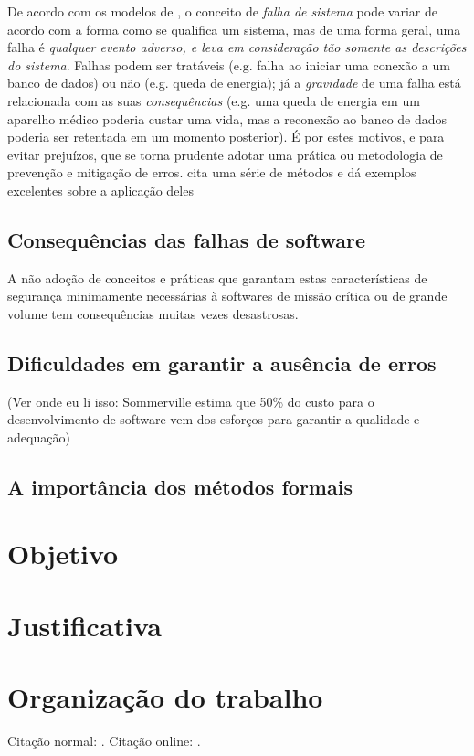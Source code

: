     De acordo com os modelos de \citeauthor{rushby_critical_1994}, o conceito 
    de \emph{falha de sistema} pode variar de acordo com a forma como se 
    qualifica um sistema, mas de uma forma geral, uma falha é \emph{qualquer 
    evento adverso, e leva em consideração tão somente as descrições do 
    sistema}. Falhas podem ser tratáveis (e.g. falha ao iniciar uma conexão a 
    um banco de dados) ou não (e.g. queda de energia); já a \emph{gravidade} de 
    uma falha está relacionada com as suas \emph{consequências} (e.g. uma queda 
    de energia em um aparelho médico poderia custar uma vida, mas a reconexão 
    ao banco de dados poderia ser retentada em um momento posterior). É por 
    estes motivos, e para evitar prejuízos, que se torna prudente adotar uma 
    prática ou metodologia de prevenção e mitigação de erros.    
    \cite{sommerville_critical_2008} cita uma série de métodos e dá exemplos 
    excelentes sobre a aplicação deles

    
    \subsection{Consequências das falhas de software}
    
    A não adoção de conceitos e práticas que garantam estas características de 
    segurança minimamente necessárias à softwares de missão crítica ou de 
    grande volume tem consequências muitas vezes desastrosas.
    
    \subsection{Dificuldades em garantir a ausência de erros}
    
    (Ver onde eu li isso: Sommerville estima que 50\% do custo para o 
    desenvolvimento de software vem dos esforços para garantir a qualidade e 
    adequação)

    \subsection{A importância dos métodos formais}
        
    \section{Objetivo}
    \section{Justificativa}
    \section{Organização do trabalho}
    Citação normal: \cite{chawdhary_simple_2014}. Citação online: .